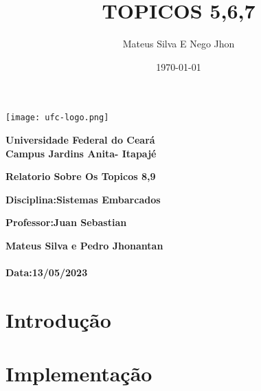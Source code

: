 \documentclass[a4paper,12pt]{article}
\title{TOPICOS 5,6,7}
\author{Mateus Silva E Nego Jhon}
\date{\today}
\begin{document}
\begin{titlepage}
    \begin{center}
        \texttt{[image: ufc-logo.png]} %
        \vspace{2cm}
        
        {\Large\textbf{Universidade Federal do Ceará}} \\
        \vspace{0.5cm}
        {\Large\textbf{Campus Jardins Anita- Itapajé}} \\
        \vspace{4cm}
        
        {\Large\textbf{Relatorio Sobre Os Topicos 8,9}} \\
        \vspace{1cm}
        
        {\large\textbf{Disciplina:Sistemas Embarcados}} \\
        \vspace{1cm}
        
        {\large\textbf{Professor:Juan Sebastian}} \\
        
        \vfill
        
        {\large\textbf{Mateus Silva e Pedro Jhonantan}} \\
        \vspace{2cm}
        {\large\textbf{}} \\
        
        \vspace{2cm}
        {\large\textbf{Data:13/05/2023}}
    \end{center}
\end{titlepage}


\section{\fontsize{21}{32}\selectfont Introdução}




\section{\fontsize{21}{32}\selectfont Implementação}
\
\end{document}
